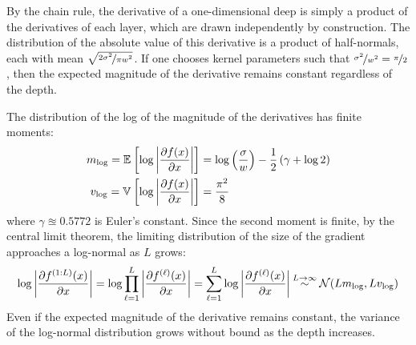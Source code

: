 By the chain rule, the derivative of a one-dimensional deep \gp{} is simply a product of the derivatives of each layer, which are drawn independently by construction.
The distribution of the absolute value of this derivative is a product of half-normals, each with mean $\sqrt{\nicefrac{2 \sigma^2}{\pi w^2}}$.
%
%
If one chooses kernel parameters such that ${\nicefrac{\sigma^2}{w^2} = \nicefrac{\pi}{2}}$, then the expected magnitude of the derivative remains constant regardless of the depth.


The distribution of the log of the magnitude of the derivatives has finite moments:
%
\begin{align}
m_{\log} = \mathbb{E}_{} \left[ {\log \left| \frac{\partial f(x)}{\partial x} \right|} \right] & = \log\left(\frac{\sigma}{w}\right) - \frac{1}{2}\left(\gamma + \log 2\right) \nonumber \\
v_{\log} = \mathbb{V}_{} \left[ {\log \left| \frac{\partial f(x)}{\partial x} \right|} \right] & = \frac{\pi^2}{8}
\end{align}
%
where $\gamma \approxeq 0.5772$ is Euler's constant.  Since the second moment is finite, by the central limit theorem, the limiting distribution of the size of the gradient approaches a log-normal as $L$ grows:
%
\begin{align}
\log \left| \frac{\partial f^{(1:L)}(x)}{\partial x} \right| 
 = \log \prod_{\ell=1}^L \left| \frac{\partial f^{(\ell)}(x)}{\partial x} \right| 
 = \sum_{\ell=1}^L \log \left| \frac{\partial f^{(\ell)}(x)}{\partial x} \right| 
\mathbin{\overset{L \rightarrow \infty}{\sim}} \mathcal{N}\!\left( L m_{\log} ,L v_{\log}\right)
\end{align}
%
Even if the expected magnitude of the derivative remains constant, the variance of the log-normal distribution grows without bound as the depth increases.

